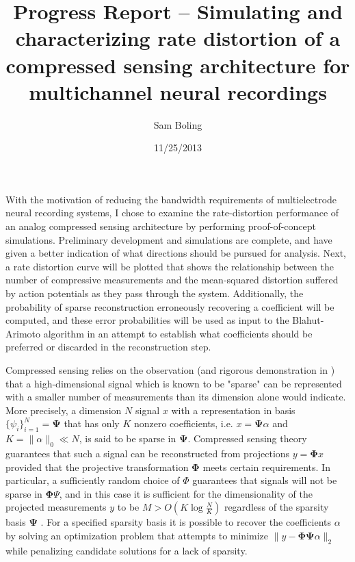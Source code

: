 \documentclass{paper}
\title{Progress Report -- Simulating and characterizing rate distortion of a compressed sensing architecture for multichannel neural recordings}
\author{Sam Boling}
\date{11/25/2013}
\begin{document}
\maketitle

With the motivation of reducing the bandwidth requirements of multielectrode
neural recording systems, I chose to examine the rate-distortion performance
of an analog compressed sensing architecture by performing proof-of-concept 
simulations. Preliminary development and simulations are complete, and have
given a better indication of what directions should be pursued for 
analysis. Next, a rate distortion curve will be plotted that shows the
relationship between the number of compressive measurements and the 
mean-squared distortion suffered by action potentials as they pass through
the system. Additionally, the probability of sparse reconstruction 
erroneously recovering a coefficient will be computed, and these error 
probabilities will be used as input to the Blahut-Arimoto algorithm in an
attempt to establish what coefficients should be preferred or discarded in
the reconstruction step.

Compressed sensing relies on the observation (and rigorous demonstration in
\cite{candes2006}) that a high-dimensional signal which is known to be 
"sparse" can be represented with a smaller number of measurements than its 
dimension alone would indicate. More precisely, a dimension $N$ signal 
$x$ with a representation in basis $\{\psi_i\}_{i=1}^N = \mathbf{\Psi}$ that
has only $K$ nonzero coefficients, i.e. $x = \mathbf{\Psi}\alpha$ 
and $K = \|\alpha\|_0 \ll N$, is said to be sparse in $\mathbf{\Psi}$. 
Compressed sensing theory guarantees that such a signal can be reconstructed
from projections $y = \mathbf{\Phi}x$ provided that the projective 
transformation $\mathbf{\Phi}$ meets certain requirements. In particular,
a sufficiently random choice of $\Phi$ guarantees that signals will not be
sparse in $\mathbf{\Phi}{\Psi}$, and in this case it is sufficient for the
dimensionality of the projected measurements $y$ to be 
$M > O\left(K \log \frac{N}{K}\right)$ regardless of the sparsity basis
$\mathbf{\Psi}$ \cite{candes2010}. For a specified sparsity basis it is 
possible to recover the coefficients $\alpha$ by solving an optimization
problem that attempts to minimize 
$\|y - \mathbf{\Phi}\mathbf{\Psi}\alpha\|_2$ 
while penalizing candidate solutions for a lack of sparsity. 
\end{document}
